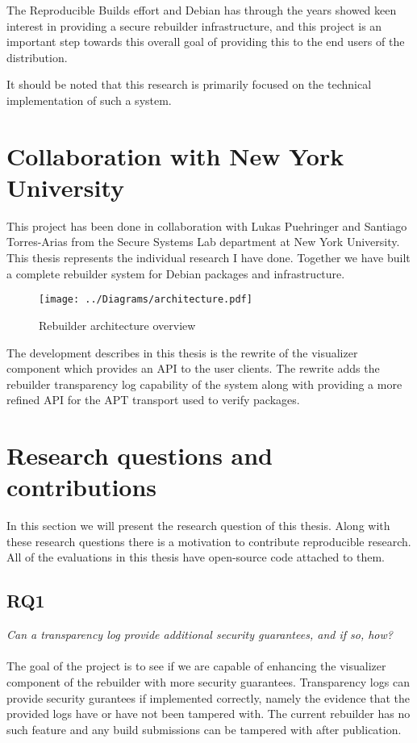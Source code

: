 \documentclass[../Main/thesis.tex]{subfiles}
\begin{document}
The Reproducible Builds effort and Debian has through the years showed keen
interest in providing a secure rebuilder infrastructure, and this project is
an important step towards this overall goal of providing this to the end users
of the distribution.

It should be noted that this research is primarily focused on the technical
implementation of such a system.

\section{Collaboration with New York University}\label{sec:collab}
This project has been done in collaboration with Lukas Puehringer and Santiago
Torres-Arias from the Secure Systems Lab department at New York University. This
thesis represents the individual research I have done. Together we have built a
complete rebuilder system for Debian packages and infrastructure. 

\begin{figure}[H]
\centering
\texttt{[image: ../Diagrams/architecture.pdf]}
\caption{Rebuilder architecture overview}
\label{fig:rebuilder_architecture}
\end{figure}

The development describes in this thesis is the rewrite of the visualizer
component which provides an API to the user clients. The rewrite adds the
rebuilder transparency log capability of the system along with providing a more
refined API for the APT transport used to verify packages.

\section{Research questions and contributions}\label{sec:rq}
In this section we will present the research question of this thesis.  Along
with these research questions there is a motivation to contribute reproducible
research. All of the evaluations in this thesis have open-source code attached
to them.

\subsection*{RQ1}%
\label{sub:rq1}
\textit{Can a transparency log provide additional security guarantees, and if so, how?}
\\\\
The goal of the project is to see if we are capable of enhancing the visualizer
component of the rebuilder with more security guarantees. Transparency logs can
provide security gurantees if implemented correctly, namely the evidence that
the provided logs have or have not been tampered with. The current rebuilder
has no such feature and any build submissions can be tampered with after
publication.
\end{document}
